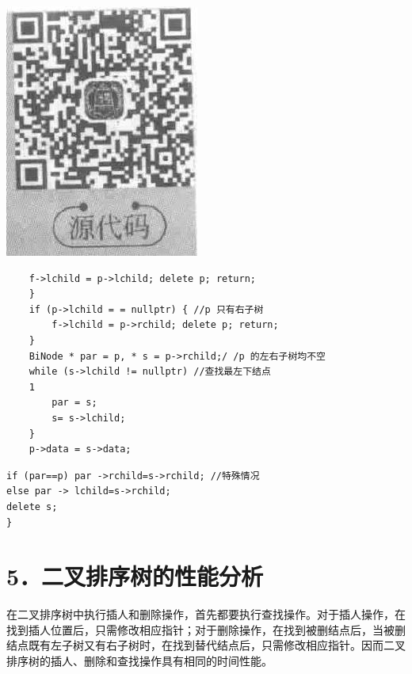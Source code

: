 \documentclass[10pt]{article}
\begin{document}
\begin{center}
\includegraphics[max width=\textwidth]{2025_06_06_704745ea57b15b2333e5g-243}
\end{center}

\begin{verbatim}
    f->lchild = p->lchild; delete p; return;
    }
    if (p->lchild = = nullptr) { //p 只有右子树
        f->lchild = p->rchild; delete p; return;
    }
    BiNode * par = p, * s = p->rchild;/ /p 的左右子树均不空
    while (s->lchild != nullptr) //查找最左下结点
    1
        par = s;
        s= s->lchild;
    }
    p->data = s->data;
\end{verbatim}

\begin{verbatim}
if (par==p) par ->rchild=s->rchild; //特殊情况
else par -> lchild=s->rchild;
delete s;
}
\end{verbatim}

\section*{5．二叉排序树的性能分析}
在二叉排序树中执行插人和删除操作，首先都要执行查找操作。对于插人操作，在找到插人位置后，只需修改相应指针；对于删除操作，在找到被删结点后，当被删结点既有左子树又有右子树时，在找到替代结点后，只需修改相应指针。因而二叉排序树的插人、删除和查找操作具有相同的时间性能。
\end{document}
